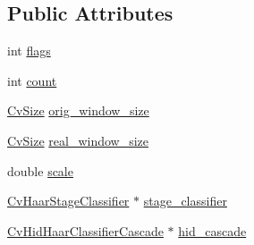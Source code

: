 \subsection*{Public Attributes}
\begin{DoxyCompactItemize}
\item 
int \hyperlink{structCvHaarClassifierCascade_aaf6347a08a65f141a0a4df631b2e2b84}{flags}
\item 
int \hyperlink{structCvHaarClassifierCascade_aa9c7a58dc90dc51577887eea9d2d3611}{count}
\item 
\hyperlink{structCvSize}{Cv\-Size} \hyperlink{structCvHaarClassifierCascade_ae76300517ac3267abdbab4a94748cad4}{orig\-\_\-window\-\_\-size}
\item 
\hyperlink{structCvSize}{Cv\-Size} \hyperlink{structCvHaarClassifierCascade_aa2fe8931f5ddca5226afdb32cea3009e}{real\-\_\-window\-\_\-size}
\item 
double \hyperlink{structCvHaarClassifierCascade_a4f8094de0e583edc4111ef2dec7635cd}{scale}
\item 
\hyperlink{structCvHaarStageClassifier}{Cv\-Haar\-Stage\-Classifier} $\ast$ \hyperlink{structCvHaarClassifierCascade_ac8144272b80ea6e240df6c827336004b}{stage\-\_\-classifier}
\item 
\hyperlink{objdetect_8hpp_aa2cff51069a20252ece5d11554c178be}{Cv\-Hid\-Haar\-Classifier\-Cascade} $\ast$ \hyperlink{structCvHaarClassifierCascade_a2738077428d6d332dfc13cd0cb316b45}{hid\-\_\-cascade}
\end{DoxyCompactItemize}


